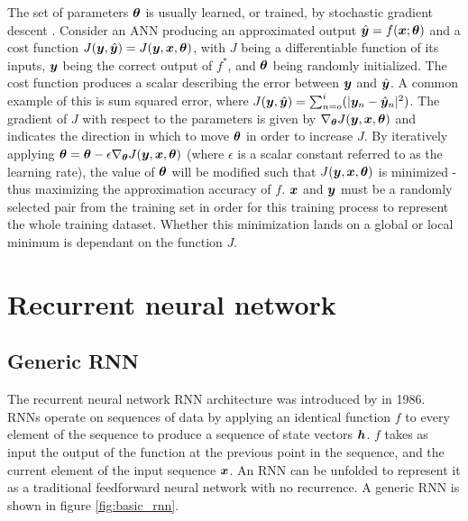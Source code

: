 
\par
The set of parameters ${\bm{\theta}}$ is usually learned, or trained, by stochastic gradient descent \citep{Bottou2011}.
Consider an ANN producing an approximated output $\hat{{\bm{y}}} = f({\bm{x}}; {\bm{\theta}})$ and a cost function $J({\bm{y}}, \hat{{\bm{y}}}) = J({\bm{y}}, {\bm{x}}, {\bm{\theta}})$, with  $J$ being a differentiable function of its inputs, ${\bm{y}}$ being the correct output of $f^*$, and ${\bm{\theta}}$ being randomly initialized.
The cost function produces a scalar describing the error between ${\bm{y}}$ and $\hat{{\bm{y}}}$.
A common example of this is sum squared error, where $J({\bm{y}}, \hat{{\bm{y}}}) = \sum_{n=o}^{i}(|{\bm{y}}_n - \hat{{\bm{y}}}_n|^2)$.
The gradient of $J$ with respect to the parameters is given by $\nabla_{{\bm{\theta}}}J({\bm{y}}, {\bm{x}}, {\bm{\theta}})$ and indicates the direction in which to move ${\bm{\theta}}$ in order to increase $J$.
By iteratively applying ${\bm{\theta}} = {\bm{\theta}} - \epsilon \nabla_{{\bm{\theta}}}J({\bm{y}}, {\bm{x}}, {\bm{\theta}})$ (where $\epsilon$ is a scalar constant referred to as the learning rate), the value of ${\bm{\theta}}$ will be modified such that $J({\bm{y}}, {\bm{x}}, {\bm{\theta}})$ is minimized - thus maximizing the approximation accuracy of $f$.
${\bm{x}}$ and ${\bm{y}}$ must be a randomly selected pair from the training set in order for this training process to represent the whole training dataset.
Whether this minimization lands on a global or local minimum is dependant on the function $J$.
\par


\section{Recurrent neural network}

\subsection{Generic RNN}
The recurrent neural network RNN architecture was introduced by \cite{Rumelhart1986} in 1986.
RNNs operate on sequences of data by applying an identical function $f$ to every element of the sequence to produce a sequence of state vectors ${\bm{h}}$.
$f$ takes as input the output of the function at the previous point in the sequence, and the current element of the input sequence ${\bm{x}}$.
An RNN can be unfolded to represent it as a traditional feedforward neural network with no recurrence.
A generic RNN is shown in figure \ref{fig:basic_rnn}.

